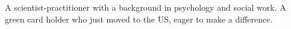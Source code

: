 

\begin{cvparagraph}

A scientist-practitioner with a background in psychology and social work. A green card holder who just moved to the US, eager to make a difference.
\end{cvparagraph}
\vspace{-2mm}
